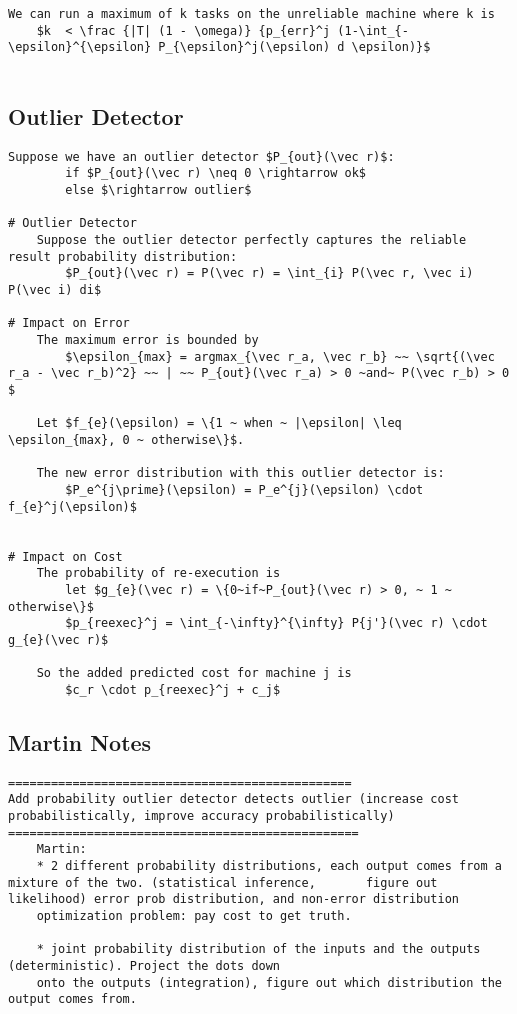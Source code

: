 \documentclass[11pt, oneside]{article}   	%
\begin{document}
\begin{lstlisting}[mathescape]
  	We can run a maximum of k tasks on the unreliable machine where k is
  	$k  < \frac {|T| (1 - \omega)} {p_{err}^j (1-\int_{-\epsilon}^{\epsilon} P_{\epsilon}^j(\epsilon) d \epsilon)}$
  	
\end{lstlisting}


\subsection{Outlier Detector}
\begin{lstlisting}[mathescape]
	Suppose we have an outlier detector $P_{out}(\vec r)$:
		if $P_{out}(\vec r) \neq 0 \rightarrow ok$
		else $\rightarrow outlier$
		
# Outlier Detector
	Suppose the outlier detector perfectly captures the reliable result probability distribution: 
		$P_{out}(\vec r) = P(\vec r) = \int_{i} P(\vec r, \vec i) P(\vec i) di$
	
# Impact on Error
	The maximum error is bounded by
		$\epsilon_{max} = argmax_{\vec r_a, \vec r_b} ~~ \sqrt{(\vec r_a - \vec r_b)^2} ~~ | ~~ P_{out}(\vec r_a) > 0 ~and~ P(\vec r_b) > 0 $
	
	Let $f_{e}(\epsilon) = \{1 ~ when ~ |\epsilon| \leq \epsilon_{max}, 0 ~ otherwise\}$. 
	
	The new error distribution with this outlier detector is:
		$P_e^{j\prime}(\epsilon) = P_e^{j}(\epsilon) \cdot f_{e}^j(\epsilon)$ 
	

# Impact on Cost
	The probability of re-execution is
	    let $g_{e}(\vec r) = \{0~if~P_{out}(\vec r) > 0, ~ 1 ~ otherwise\}$
		$p_{reexec}^j = \int_{-\infty}^{\infty} P{j'}(\vec r) \cdot g_{e}(\vec r)$
	
	So the added predicted cost for machine j is
		$c_r \cdot p_{reexec}^j + c_j$
\end{lstlisting}
\subsection{Martin Notes}

\begin{lstlisting}[mathescape]
================================================
Add probability outlier detector detects outlier (increase cost probabilistically, improve accuracy probabilistically)
=================================================
	Martin:
	* 2 different probability distributions, each output comes from a mixture of the two. (statistical inference, 		figure out likelihood) error prob distribution, and non-error distribution
	optimization problem: pay cost to get truth.
	   
	* joint probability distribution of the inputs and the outputs (deterministic). Project the dots down
	onto the outputs (integration), figure out which distribution the output comes from.
\end{lstlisting}
\end{document}
